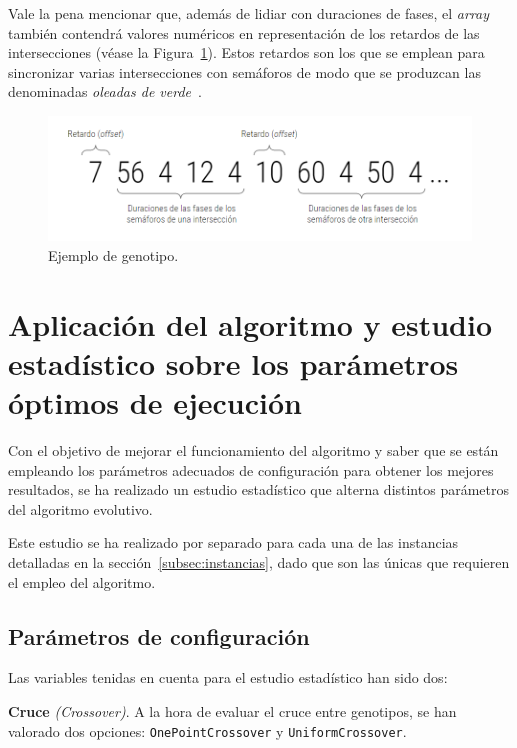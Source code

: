 Vale la pena mencionar que, además de lidiar con duraciones de fases, el \textit{array} también contendrá valores numéricos en representación de los retardos de las intersecciones (véase la Figura~\ref{fig:genotipo}). Estos retardos son los que se emplean para sincronizar varias intersecciones con semáforos de modo que se produzcan las denominadas \textit{oleadas de verde}~\cite{segredo_optimising_2019}.


\begin{figure}[ht]
    \centering
    \includegraphics[width=\textwidth]{report/images/genotipo.png}
    \caption{Ejemplo de genotipo.}
    \label{fig:genotipo}
\end{figure}

\section{Aplicación del algoritmo y estudio estadístico sobre los parámetros óptimos de ejecución}

Con el objetivo de mejorar el funcionamiento del algoritmo y saber que se están empleando los parámetros adecuados de configuración para obtener los mejores resultados, se ha realizado un estudio estadístico que alterna distintos parámetros del algoritmo evolutivo.

Este estudio se ha realizado por separado para cada una de las instancias detalladas en la sección~\ref{subsec:instancias}, dado que son las únicas que requieren el empleo del algoritmo.

\subsection{Parámetros de configuración}

Las variables tenidas en cuenta para el estudio estadístico han sido dos:

\textbf{Cruce} \textit{(Crossover)}. A la hora de evaluar el cruce entre genotipos, se han valorado dos opciones: \texttt{OnePointCrossover} y \texttt{UniformCrossover}.

